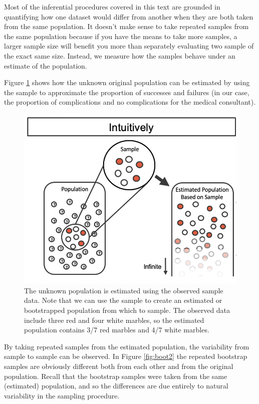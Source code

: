 \documentclass[
  10pt,
  openany]{book}
\begin{document}
Most of the inferential procedures covered in this text are grounded in quantifying how one dataset would differ from another when they are both taken from the same population.
It doesn't make sense to take repeated samples from the same population because if you have the means to take more samples, a larger sample size will benefit you more than separately evaluating two sample of the exact same size.
Instead, we measure how the samples behave under an estimate of the population.

Figure \ref{fig:boot1} shows how the unknown original population can be estimated by using the sample to approximate the proportion of successes and failures (in our case, the proportion of complications and no complications for the medical consultant).

\begin{figure}[h]

{\centering \includegraphics[width=0.75\linewidth]{images/boot1prop1} 

}

\caption{The unknown population is estimated using the observed sample data.  Note that we can use the sample to create an estimated or bootstrapped population from which to sample.  The observed data include three red and four white marbles, so the estimated population contains 3/7 red marbles and 4/7 white marbles.}\label{fig:boot1}
\end{figure}

By taking repeated samples from the estimated population, the variability from sample to sample can be observed.
In Figure \ref{fig:boot2} the repeated bootstrap samples are obviously different both from each other and from the original population.
Recall that the bootstrap samples were taken from the same (estimated) population, and so the differences are due entirely to natural variability in the sampling procedure.
\end{document}
